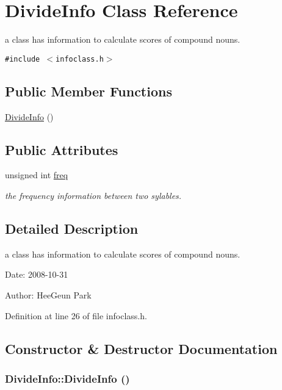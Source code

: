 \hypertarget{classDivideInfo}{
\section{DivideInfo Class Reference}
\label{classDivideInfo}
}
a class has information to calculate scores of compound nouns.  


{\tt \#include $<$infoclass.h$>$}

\subsection*{Public Member Functions}
\begin{CompactItemize}
\item 
\hyperlink{classDivideInfo_b1c6eb10c4f7b9c4c1418edd36ccef28}{DivideInfo} ()
\end{CompactItemize}
\subsection*{Public Attributes}
\begin{CompactItemize}
\item 
unsigned int \hyperlink{classDivideInfo_bedb3100c1c1169f250df70c59afb2d8}{freq}
\begin{CompactList}\small\item\em the frequency information between two sylables. \item\end{CompactList}\end{CompactItemize}


\subsection{Detailed Description}
a class has information to calculate scores of compound nouns. 

\begin{Desc}
\item[Date:]2008-10-31 \end{Desc}
\begin{Desc}
\item[Author:]HeeGeun Park \end{Desc}


Definition at line 26 of file infoclass.h.

\subsection{Constructor \& Destructor Documentation}
\hypertarget{classDivideInfo_b1c6eb10c4f7b9c4c1418edd36ccef28}{
\subsubsection[{DivideInfo}]{\setlength{\rightskip}{0pt plus 5cm}DivideInfo::DivideInfo ()}}
\label{classDivideInfo_b1c6eb10c4f7b9c4c1418edd36ccef28}




